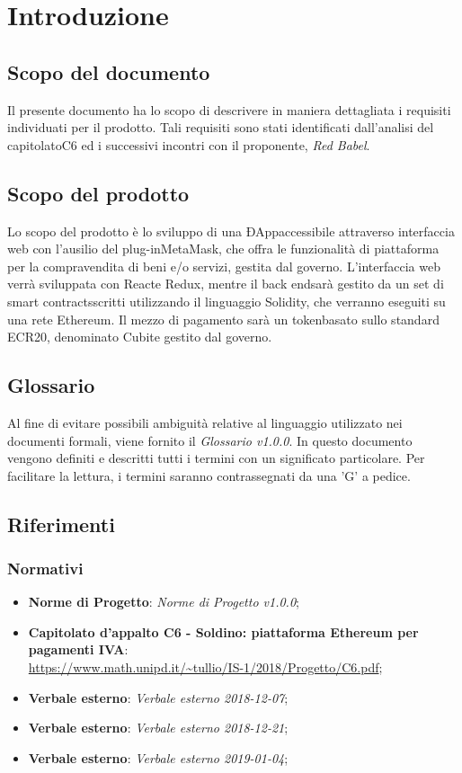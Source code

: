 \section{Introduzione} 
\subsection{Scopo del documento}
Il presente documento ha lo scopo di descrivere in maniera dettagliata i requisiti individuati per il prodotto. Tali requisiti sono stati identificati dall'analisi del capitolato\glosp C6 ed i successivi incontri con il proponente, \textit{Red Babel}.
\subsection{Scopo del prodotto}
Lo scopo del prodotto è lo sviluppo di una ÐApp\glosp accessibile attraverso interfaccia web con l'ausilio del plug-in\glosp MetaMask\glo, che offra le funzionalità di piattaforma per la compravendita di beni e/o servizi, gestita dal governo\glo. L'interfaccia web verrà sviluppata con React\glosp e Redux\glo, mentre il back end\glosp sarà gestito da un set di smart contracts\glosp scritti utilizzando il linguaggio Solidity\glo, che verranno eseguiti su una rete Ethereum\glo.  Il mezzo di pagamento sarà un token\glosp basato sullo standard ECR20\glo, denominato Cubit\glosp e gestito dal governo\glo.

\subsection{Glossario}
Al fine di evitare possibili ambiguità relative al linguaggio utilizzato nei documenti formali, viene fornito il \textit{Glossario v1.0.0}. In questo documento vengono definiti e descritti tutti i termini con un significato particolare. Per facilitare la lettura, i termini saranno contrassegnati da una 'G' a pedice.
\subsection{Riferimenti}
\subsubsection{Normativi}
\begin{itemize}
	\item \textbf{Norme di Progetto}: \textit{Norme di Progetto v1.0.0};

	\item \textbf{Capitolato d'appalto C6 - Soldino: piattaforma Ethereum per pagamenti IVA}: \\ \url{ https://www.math.unipd.it/~tullio/IS-1/2018/Progetto/C6.pdf};
	\item \textbf{Verbale esterno}: \textit{Verbale esterno 2018-12-07};
	\item \textbf{Verbale esterno}: \textit{Verbale esterno 2018-12-21};
	\item \textbf{Verbale esterno}: \textit{Verbale esterno 2019-01-04};
\end{itemize}
